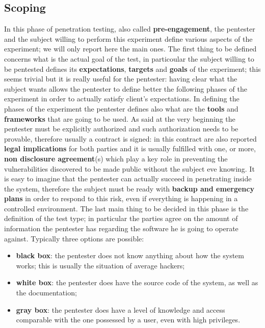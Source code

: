 \subsection{Scoping}
In this phase of penetration testing, also called \textbf{pre-engagement}, the pentester and the subject willing to perform this experiment define various aspects of the experiment; we will only report here the main ones.
\newline
The first thing to be defined concerns what is the actual goal of the test, in particoular the subject willing to be pentested defines its \textbf{expectations}, \textbf{targets} and \textbf{goals} of the experiment; this seems trivial but it is really useful for the pentester: having clear what the subject wants allows the pentester to define better the following phases of the experiment in order to actually satisfy client's expectations. In defining the phases of the experiment the pentester defines also what are the \textbf{tools} and \textbf{frameworks} that are going to be used.
\newline
As said at the very beginning the pentester must be explicitly authorized and such authorization needs to be provable, therefore usually a contract is signed: in this contract are also reported \textbf{legal implications} for both parties and it is usually fulfilled with one, or more, \textbf{non disclosure agreement}(s) which play a key role in preventing the vulnerabilities discovered to be made public without the subject eve knowing.
It is easy to imagine that the pentester can actually succeed in penetrating inside the system, therefore the subject must be ready with \textbf{backup and emergency plans} in order to respond to this risk, even if everything is happening in a controlled environment.
\newline
The last main thing to be decided in this phase is the definition of the test type; in particular the parties agree on the amount of information the pentester has regarding the software he is going to operate against. Typically three options are possible\cite{online:black-box-pt}:
\begin{itemize}
    \item \textbf{black box}: the pentester does not know anything about how the system works; this is usually the situation of average hackers;
    \item \textbf{white box}: the pentester does have the source code of the system, as well as the documentation;
    \item \textbf{gray box}: the pentester does have a level of knowledge and access comparable with the one possessed by a user, even with high privileges.
\end{itemize}

